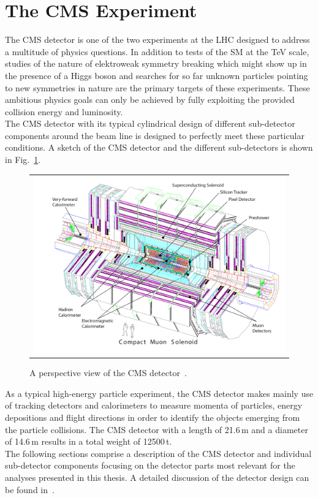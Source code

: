 \section{The CMS Experiment}
\label{sec:cms}
The CMS detector is one of the two experiments at the LHC designed to address a multitude of physics questions. In addition to tests of the SM at the TeV scale, studies of the nature of elektroweak symmetry breaking which might show up in the presence of a Higgs boson and searches for so far unknown particles pointing to \eg new symmetries in nature are the primary targets of these experiments. These ambitious physics goals can only be achieved by fully exploiting the provided collision energy and luminosity.\\
The CMS detector with its typical cylindrical design of different sub-detector components around the beam line is designed to perfectly meet these particular conditions. A sketch of the CMS detector and the different sub-detectors is shown in Fig.~\ref{fig:CMS}.
\begin{figure}[!tp]
  \centering
  \begin{tabular}{c}
    \includegraphics[width=1.0\textwidth]{figures/Figures_Experimental_Apparatus_CMS_perspective.png}
  \end{tabular}
  \caption{A perspective view of the CMS detector~\cite{Chatrchyan:2008zzk}.}
  \label{fig:CMS}
\end{figure}
As a typical high-energy particle experiment, the CMS detector makes mainly use of tracking detectors and calorimeters to measure momenta of particles, energy depositions and flight directions in order to identify the objects emerging from the particle collisions. The CMS detector with a length of 21.6\,m and a diameter of 14.6\,m results in a total weight of 12500\,t. \\  
The following sections comprise a description of the CMS detector and individual sub-detector components focusing on the detector parts most relevant for the analyses presented in this thesis. A detailed discussion of the detector design can be found in~\cite{Chatrchyan:2008zzk, bib:cmsptdr1}.

